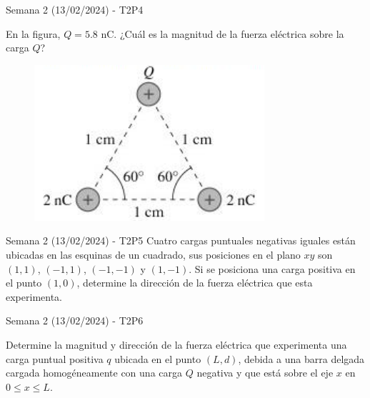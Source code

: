 \begin{frame}{Semana 2 (13/02/2024) - T2P4}
    
    En la figura, $Q = 5.8$ nC. ¿Cuál es la magnitud de la fuerza el\'ectrica sobre la carga $Q$?
    
    \begin{figure}
        \centering
        \includegraphics[scale=0.5]{figures/t2p4.png}
    \end{figure}
    
\end{frame}

\begin{frame}{Semana 2 (13/02/2024) - T2P5}
    Cuatro cargas puntuales negativas iguales están ubicadas en las esquinas de un cuadrado, sus posiciones en el plano $xy$ son $(1, 1)$, $(-1, 1)$, $(-1, -1)$ y $(1, -1)$. Si se posiciona una carga positiva en el punto $(1,0)$, determine la direcci\'on de la fuerza el\'ectrica que esta experimenta.
\end{frame}

\begin{frame}{Semana 2 (13/02/2024) - T2P6}
    
    Determine la magnitud y direcci\'on de la fuerza el\'ectrica que experimenta una carga puntual positiva $q$ ubicada en el punto $(L,d)$, debida a una barra delgada cargada homogéneamente con una carga $Q$ negativa y que est\'a sobre el eje $x$ en $0\leq x\leq L$.
    
\end{frame}

